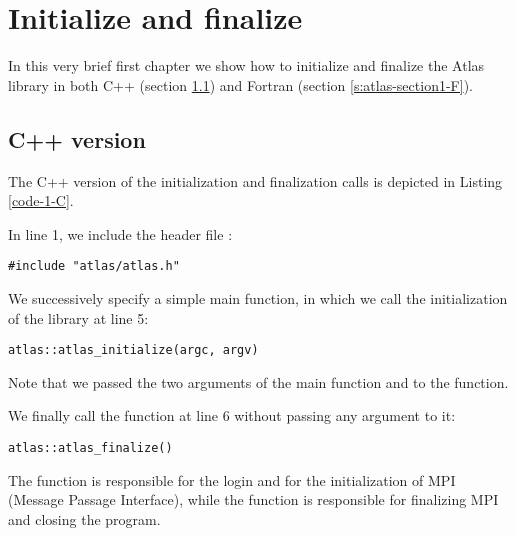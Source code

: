 \chapter{Initialize and finalize}
In this very brief first chapter we show how to initialize 
and finalize the Atlas library in both C++ (section 
\ref{s:atlas-section1-C}) and Fortran (section 
\ref{s:atlas-section1-F}). 



\section{C++ version}
\label{s:atlas-section1-C}
The C++ version of the \Atlas initialization and finalization 
calls is depicted in Listing \ref{code-1-C}.
%

%
In line 1, we include the \Atlas header file :
%
\begin{lstlisting}[style=CStyleNoLine]
#include "atlas/atlas.h"
\end{lstlisting}
%
We successively specify a simple main function, in which 
we call the initialization of the \Atlas library at line 5:
%
\begin{lstlisting}[style=CStyleNoLine]
atlas::atlas_initialize(argc, argv)
\end{lstlisting}
%
Note that we passed the two arguments of the main function 
 and  to the  
function.

We finally call the \Atlas {} function 
at line 6 without passing any argument to it:
%
\begin{lstlisting}[style=CStyleNoLine]
atlas::atlas_finalize()
\end{lstlisting}
%

The function  is responsible for 
the login and for the initialization of MPI (Message Passage 
Interface), while the function  is 
responsible for finalizing MPI and closing the program.

